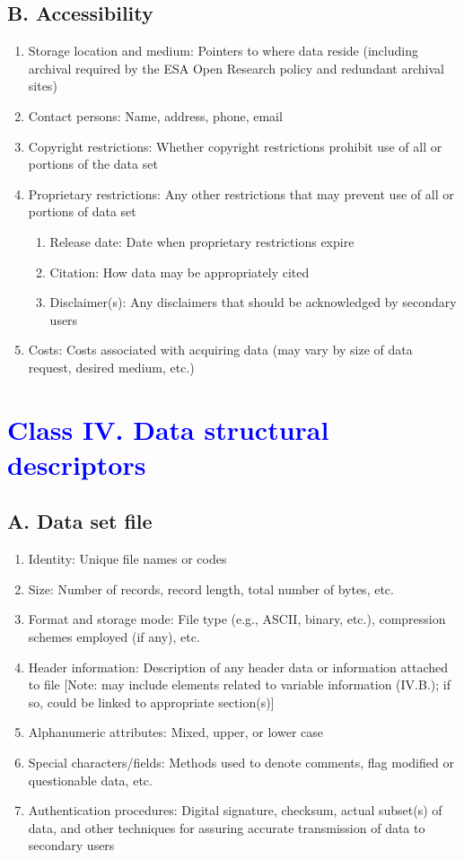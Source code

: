 \documentclass[a4paper,twoside,10pt]{article}
\begin{document}
    \subsection*{B. Accessibility}
    		\begin{enumerate}
    			\item Storage location and medium: Pointers to where data reside (including archival required by the ESA Open Research policy and redundant archival sites)
        		\item Contact persons: Name, address, phone, email
        		\item Copyright restrictions: Whether copyright restrictions prohibit use of all or portions of the data set
        		\item Proprietary restrictions: Any other restrictions that may prevent use of all or portions of data set
        			\begin{enumerate}[label=\alph*.]
            			\item Release date: Date when proprietary restrictions expire
           			\item Citation: How data may be appropriately cited
            			\item Disclaimer(s): Any disclaimers that should be acknowledged by secondary users
            		\end{enumerate}
        		\item Costs: Costs associated with acquiring data (may vary by size of data request, desired medium, etc.)
    		\end{enumerate}
    
 \section*{\textcolor{Blue}{Class IV. Data structural descriptors}}
    \subsection*{A. Data set file}
    		\begin{enumerate}
    			\item Identity: Unique file names or codes
        		\item Size: Number of records, record length, total number of bytes, etc.
        		\item Format and storage mode: File type (e.g., ASCII, binary, etc.), compression schemes employed (if any), etc.
        		\item Header information: Description of any header data or information attached to file [Note: may include elements related to variable information (IV.B.); if so, could be linked to appropriate section(s)]
        		\item Alphanumeric attributes: Mixed, upper, or lower case
        		\item Special characters/fields: Methods used to denote comments, flag modified or questionable data, etc.
        		\item Authentication procedures: Digital signature, checksum, actual subset(s) of data, and other techniques for assuring accurate transmission of data to secondary users
    		\end{enumerate}
\end{document}
